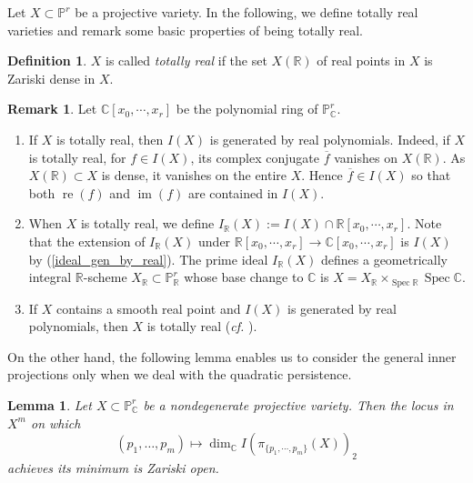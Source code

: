 \documentclass[11pt,letterpaper,reqno]{amsart}
\theoremstyle{plain}
\newtheorem{lemma}[theorem]{Lemma}
\theoremstyle{definition}
\newtheorem{definition}[theorem]{Definition}
\newtheorem{remark}[theorem]{Remark}
\newtheorem{open problem}[theorem]{Open Problem}
\newtheorem{remark and notation}[theorem]{Remark and Notation}
\newtheorem{remark and definition}[theorem]{Remark and Definition}
\newtheorem{definition and notation}[theorem]{Definition and Notation}
\newtheorem{notation and convention}[theorem]{Notation and Convention}
\newtheorem{notation and remark}[theorem]{Notation and Remark}
\newtheorem{convention and notation}[theorem]{Convention and Notation}
\def \p {\mathbb{P}}
\def \r {\mathbb{R}}
\def \c {\mathbb{C}}
\def \im {\operatorname{im}}
\def \re {\operatorname{re}}
\def \im {\operatorname{im}}
\def \spec {\operatorname{Spec}}
\begin{document}
Let $X\subset\p^r$ be a projective variety. In the following, we define totally real varieties and remark some basic properties of being totally real.

\begin{definition}
    $X$ is called \textit{totally real} if the set $X(\r)$ of real points in $X$ is Zariski dense in $X$.
\end{definition}

\begin{remark}\label{rem:tr}
    Let $\c[x_0,\cdots,x_r]$ be the polynomial ring of $\p^r_\c$.
    \begin{enumerate}[\rm (1)]
        \item\label{ideal_gen_by_real} If $X$ is totally real, then $I(X)$ is generated by real polynomials. 
        Indeed, if $X$ is totally real, for $f\in I(X)$, its complex conjugate $\overline{f}$ vanishes on $X(\r)$. 
        As $X(\r)\subset X$ is dense, it vanishes on the entire $X$.
        Hence $\overline{f}\in I(X)$ so that both $\re(f)$ and $\im(f)$ are contained in $I(X)$.
        \item When $X$ is totally real, we define $I_\r(X):=I(X)\cap \r[x_0,\cdots,x_r]$.
        Note that the extension of $I_\r(X)$ under $\r[x_0,\cdots,x_r]\to\c[x_0,\cdots,x_r]$ is $I(X)$ by (\ref{ideal_gen_by_real}). The prime ideal $I_\r(X)$ defines a geometrically integral $\r$-scheme $X_\r\subset\p^r_\r$ whose base change to $\c$ is $X=X_\r\times _{\spec\r} \spec\c$.
        \item If $X$ contains a smooth real point and $I(X)$ is generated by real polynomials, then $X$ is totally real (\textit{cf.} \cite{MR0683127}).
    \end{enumerate}
\end{remark}

On the other hand, the following lemma enables us to consider the general inner projections only when we deal with the quadratic persistence.

    \begin{lemma}\cite[Lemma 3.3]{MR4397034}\label{lem:qp}
    Let $X\subset \p_{\c}^r$ be a nondegenerate projective variety.
    Then the locus in $X^m$ on which $$(p_1,\dots,p_m)\mapsto \dim_\c I(\pi_{\{p_1,\cdots,p_m\}}(X))_2$$ achieves its minimum is Zariski open.
    \end{lemma}
\end{document}
